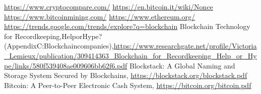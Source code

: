 \documentclass[a4paper]{article}
\begin{document}
\begin{thebibliography}{9}
\url{https://www.cryptocompare.com/}
\url{https://en.bitcoin.it/wiki/Nonce}
\url{https://www.bitcoinmining.com/}
\url{https://www.ethereum.org/}
\url{https://trends.google.com/trends/explore?q=blockchain}
 Blockchain Technology for Recordkeeping,\enspace Help\enspace or\enspace Hype\enspace ?\enspace (Appendix\enspace C:\enspace Blockchain\enspace companies),\newline \url{https://www.researchgate.net/profile/Victoria_Lemieux/publication/309414363_Blockchain_for_Recordkeeping_Help_or_Hype/links/580f539408ae009606bb62f6.pdf}
Blockstack: A Global Naming and Storage System Secured by Blockchains, \url{https://blockstack.org/blockstack.pdf}
Bitcoin: A Peer-to-Peer Electronic Cash System, \url{https://bitcoin.org/bitcoin.pdf} 
\end{thebibliography}
\end{document}
